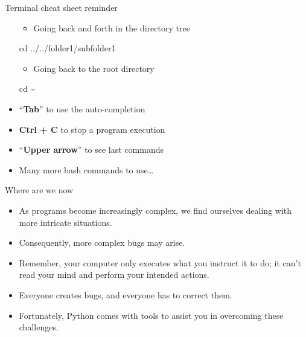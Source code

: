 \documentclass[
  8pt,
  ignorenonframetext,
]{beamer}
\newenvironment{Shaded}{\begin{snugshade}}{\end{snugshade}}
\newcommand{\BuiltInTok}[1]{#1}
\newcommand{\NormalTok}[1]{#1}
\providecommand{\tightlist}{%
  \setlength{\itemsep}{0pt}\setlength{\parskip}{0pt}}
\begin{document}
\begin{frame}[fragile]{Terminal cheat sheet reminder}
\begin{itemize}
  \begin{itemize}
  \tightlist
  \item
    Going back and forth in the directory tree
  \end{itemize}

\begin{Shaded}
\begin{Highlighting}[]
\BuiltInTok{cd}\NormalTok{ ../../folder1/subfolder1}
\end{Highlighting}
\end{Shaded}

  \begin{itemize}
  \tightlist
  \item
    Going back to the root directory
  \end{itemize}

\begin{Shaded}
\begin{Highlighting}[]
\BuiltInTok{cd}\NormalTok{ \textasciitilde{}}
\end{Highlighting}
\end{Shaded}
\item
  ``\textbf{Tab}'' to use the auto-completion
\item
  \textbf{Ctrl + C} to stop a program execution
\item
  ``\textbf{Upper arrow}'' to see last commands
\item
  Many more bash commands to use\ldots{}
\end{itemize}
\end{frame}

\begin{frame}{Where are we now}
\protect\hypertarget{where-are-we-now}{}
\begin{itemize}[<+->]
\tightlist
\item
  As programs become increasingly complex, we find ourselves dealing
  with more intricate situations.
\end{itemize}

\begin{itemize}[<+->]
\tightlist
\item
  Consequently, more complex bugs may arise.
\end{itemize}

\begin{itemize}[<+->]
\tightlist
\item
  Remember, your computer only executes what you instruct it to do; it
  can't read your mind and perform your intended actions.
\end{itemize}

\begin{itemize}[<+->]
\tightlist
\item
  Everyone creates bugs, and everyone has to correct them.
\end{itemize}

\begin{itemize}[<+->]
\tightlist
\item
  Fortunately, Python comes with tools to assist you in overcoming these
  challenges.
\end{itemize}
\end{frame}
\end{document}
